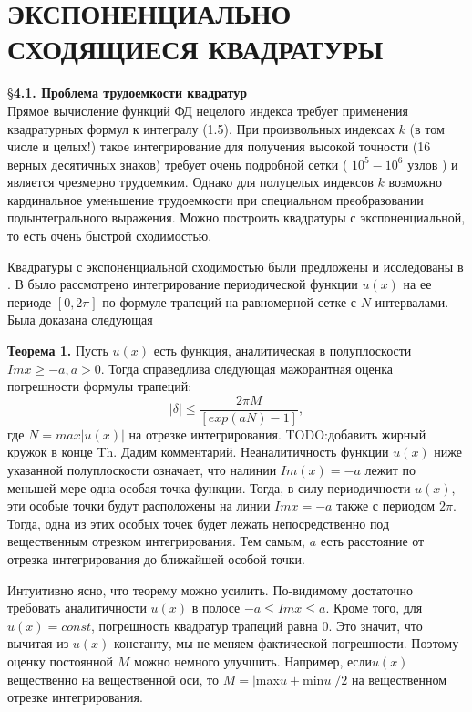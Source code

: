 \chapter{ЭКСПОНЕНЦИАЛЬНО СХОДЯЩИЕСЯ КВАДРАТУРЫ}

\S \textbf{4.1. Проблема трудоемкости квадратур}
\\

Прямое вычисление функций ФД нецелого индекса требует применения
квадратурных формул к интегралу (1.5). При произвольных индексах $k$ (в том числе и целых!) такое интегрирование для получения высокой точности (16 верных десятичных знаков) требует очень подробной сетки ( $10^5 - 10^6$ узлов ) и является чрезмерно трудоемким. Однако для полуцелых индексов $k$
возможно кардинальное уменьшение трудоемкости при специальном
преобразовании подынтегрального выражения. Можно построить квадратуры с
экспоненциальной, то есть очень быстрой сходимостью.

Квадратуры с экспоненциальной сходимостью были предложены и исследованы в \cite{SIAM,Kalitkin_Kolganov_ExpConvDan,Kalitkin_Kolganov_ExpConvMatMod}. В \cite{SIAM} было рассмотрено интегрирование периодической функции $u(x)$ на ее периоде $[0,2\pi]$ по формуле трапеций на равномерной сетке с $N$ интервалами. Была доказана следующая

\textbf{Теорема 1.} Пусть $u(x)$ есть функция, аналитическая в полуплоскости $Imx \geqslant -a, a > 0$. Тогда справедлива следующая мажорантная оценка погрешности формулы трапеций:
\begin{equation}
|\delta| \leqslant \frac{2\pi M}{[exp(aN)-1]},
\label{eq:ref4_1}
\end{equation}
где $N=max|u(x)|$ на отрезке интегрирования. TODO:добавить жирный кружок в конце Th.
Дадим комментарий. Неаналитичность функции $u(x)$ ниже указанной полуплоскости означает, что налинии $Im(x)=-a$ лежит по меньшей мере одна особая точка функции. Тогда, в силу периодичности $u(x)$, эти особые точки будут расположены на линии $Imx=-a$ также с периодом $2\pi$. Тогда, одна из этих особых точек будет лежать непосредственно под вещественным отрезком интегрирования. Тем самым, $a$ есть расстояние от отрезка интегрирования до ближайшей особой точки.

Интуитивно ясно, что теорему можно усилить. По-видимому достаточно требовать аналитичности $u(x)$ в полосе  $-a \leqslant Im x \leqslant a$. Кроме того, для $u(x)=const$, погрешность квадратур трапеций равна 0. Это значит, что вычитая из $u(x)$ константу, мы не меняем фактической погрешности. Поэтому оценку постоянной $M$ можно немного улучшить. Например, $если u(x)$ вещественно на вещественной оси, то $M=|$max$u+$min$u|/2$ на вещественном отрезке интегрирования. 

